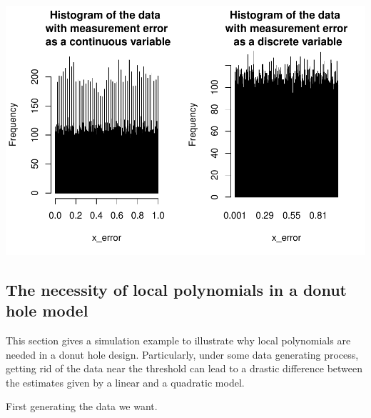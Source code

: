 \documentclass[
  11pt,
]{article}
\begin{document}
\includegraphics{49045_PB4A7_Report_files/figure-latex/unnamed-chunk-9-1.pdf}

\hypertarget{the-necessity-of-local-polynomials-in-a-donut-hole-model}{%
\subsection*{The necessity of local polynomials in a donut hole
model}\label{the-necessity-of-local-polynomials-in-a-donut-hole-model}}

This section gives a simulation example to illustrate why local
polynomials are needed in a donut hole design. Particularly, under some
data generating process, getting rid of the data near the threshold can
lead to a drastic difference between the estimates given by a linear and
a quadratic model.

First generating the data we want.
\end{document}
